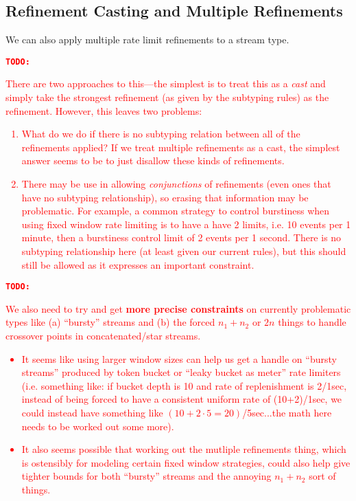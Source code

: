 \documentclass[acmsmall,nonacm,screen]{acmart}
\newcommand{\todo}[1]{\textcolor{red}{\textbf{\texttt{TODO:}} {#1}}}
\begin{document}
\subsection{Refinement Casting and Multiple Refinements}
We can also apply multiple rate limit refinements to a stream type. \todo{There are two approaches to this—the simplest is to treat this as a \textit{cast} and simply take the strongest refinement (as given by the subtyping rules) as the refinement. However, this leaves two problems:
  \begin{enumerate}
  \item What do we do if there is no subtyping relation between all of the refinements applied? If we treat multiple refinements as a cast, the simplest answer seems to be to just disallow these kinds of refinements.
  \item There may be use in allowing \textit{conjunctions} of refinements (even ones that have no subtyping relationship), so erasing that information may be problematic. For example, a common strategy to control burstiness when using fixed window rate limiting is to have a have 2 limits, i.e. 10 events per 1 minute, then a burstiness control limit of 2 events per 1 second. There is no subtyping relationship here (at least given our current rules), but this should still be allowed as it expresses an important constraint.
  \end{enumerate}}

\todo{We also need to try and get \textbf{more precise constraints} on currently problematic types like (a) ``bursty'' streams and (b) the forced $n_1+n_2$ or $2n$ things to handle crossover points in concatenated/star streams.
  \begin{itemize}
  \item It seems like using larger window sizes can help us get a handle on ``bursty streams'' produced by token bucket or ``leaky bucket as meter'' rate limiters (i.e. something like: if bucket depth is 10 and rate of replenishment is 2/1sec, instead of being forced to have a consistent uniform rate of (10+2)/1sec, we could instead have something like $(10+2\cdot 5 = 20)$/5sec...the math here needs to be worked out some more).
  \item It also seems possible that working out the mutliple refinements thing, which is ostensibly for modeling certain fixed window strategies, could also help give tighter bounds for both ``bursty'' streams and the annoying $n_1+n_2$ sort of things.
  \end{itemize}}




\end{document}
